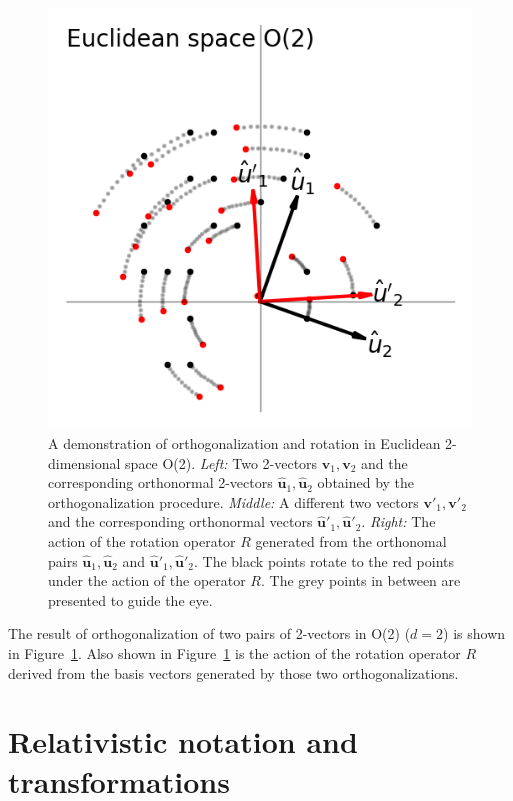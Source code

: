 \documentclass{article}
\newcommand{\Evec}[1]{{\mathbf{#1}}} %
\newcommand{\Ehat}[1]{{\mathbf{\hat{#1}}}} %
\newcommand{\figref}[1]{Figure~\ref{#1}}
\newlength{\figurewidth}
\begin{document}
\begin{figure}[t]
\begin{mdframed}
\includegraphics[width=\figurewidth]{E_Q.png}
\caption{A demonstration of orthogonalization and rotation in Euclidean 2-dimensional space O(2).
    \textsl{Left:} Two 2-vectors $\Evec{v}_1, \Evec{v}_2$ and the corresponding orthonormal 2-vectors $\Ehat{u}_1, \Ehat{u}_2$ obtained by the orthogonalization procedure.
\textsl{Middle:} A different two vectors $\Evec{v}'_1, \Evec{v}'_2$ and the corresponding orthonormal vectors $\Ehat{u}'_1, \Ehat{u}'_2$.
\textsl{Right:} The action of the rotation operator $R$ generated from the orthonomal pairs $\Ehat{u}_1, \Ehat{u}_2$ and $\Ehat{u}'_1, \Ehat{u}'_2$.
The black points rotate to the red points under the action of the operator $R$.
The grey points in between are presented to guide the eye.\label{fig:Euclid}}
\end{mdframed}
\end{figure}
The result of orthogonalization of two pairs of 2-vectors in O(2) ($d=2$) is shown in \figref{fig:Euclid}.
Also shown in \figref{fig:Euclid} is the action of the rotation operator $R$ derived from the basis vectors generated by those two orthogonalizations.

\section{Relativistic notation and transformations}\label{sec:notation}
\end{document}
